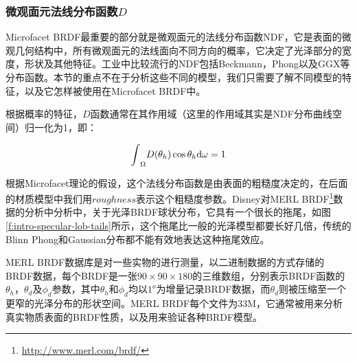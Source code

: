 \subsubsection{微观面元法线分布函数$D$}
Microfacet BRDF最重要的部分就是微观面元的法线分布函数NDF，它是表面的微观几何结构中，所有微观面元的法线面向不同方向的概率，它决定了光泽部分的宽度，形状及其他特征。工业中比较流行的NDF包括Beckmann\cite{a:TheScatteringofElectromagneticWavesfromRoughSurfaces}，Phong\cite{a:IlluminationforComputerGeneratedPictures}以及GGX\cite{a:Microfacetmodelsforrefractionthroughroughsurfaces}等分布函数。本节的重点不在于分析这些不同的模型，我们只需要了解不同模型的特征，以及它怎样被使用在Microfacet BRDF中。


根据概率的特征，$D$函数通常在其作用域（这里的作用域其实是NDF分布曲线空间）归一化为1，即：

\begin{equation}
	{\rm \int}_\Omega D(\theta_h)\cos\theta_h {\rm d}\omega =1
\end{equation}

\noindent 根据Microfacet理论的假设，这个法线分布函数是由表面的粗糙度决定的，在后面的材质模型中我们用$roughness$表示这个粗糙度参数。Disney对MERL BRDF\footnote{\url{http://www.merl.com/brdf/}}数据的分析中分析中，关于光泽BRDF球状分布，它具有一个很长的拖尾，如图\ref{f:intro-specular-lob-tails}所示，这个拖尾比一般的光泽模型都要长好几倍，传统的Blinn Phong和Gaussian分布都不能有效地表达这种拖尾效应。

\begin{shaded*}
MERL BRDF数据库是对一些实物的进行测量，以二进制数据的方式存储的BRDF数据，每个BRDF是一张$90\times 90\times 180$的三维数组，分别表示BRDF函数的$\theta_h$，$\theta_d$及$\phi_d$参数，其中$\theta_h$和$\phi_d$均以$1^o$为增量记录BRDF数据，而$\theta_d$则被压缩至一个更窄的光泽分布的形状空间。MERL BRDF每个文件为33M，它通常被用来分析真实物质表面的BRDF性质，以及用来验证各种BRDF模型。
\end{shaded*}


